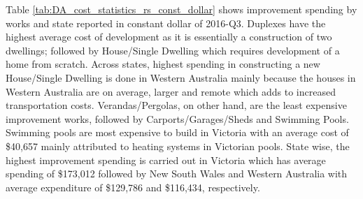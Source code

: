 \documentclass[AEJ,reqno, draftmode]{AEA} %
\begin{document}
Table \ref{tab:DA_cost_statistics_rs_const_dollar} shows improvement spending by works and state reported in constant dollar of 2016-Q3. Duplexes have the highest average cost of development as it is essentially a construction of two dwellings; followed by House/Single Dwelling which requires development of a home from scratch. Across states, highest spending in constructing a new House/Single Dwelling is done in Western Australia mainly because the houses in Western Australia are on average, larger and remote which adds to increased transportation costs. Verandas/Pergolas, on other hand, are the least expensive improvement works, followed by Carports/Garages/Sheds and Swimming Pools. Swimming pools are most expensive to build in Victoria with an average cost of \$40,657 mainly attributed to heating systems in Victorian pools. State wise, the highest improvement spending is carried out in Victoria which has average spending of \$173,012 followed by New South Wales and Western Australia with average expenditure of \$129,786 and \$116,434, respectively.





\end{document}
